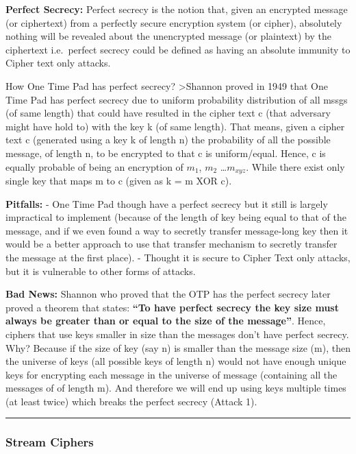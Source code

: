 \documentclass[11pt]{article}
\begin{document}
\textbf{Perfect Secrecy:} Perfect secrecy is the notion that, given an
encrypted message (or ciphertext) from a perfectly secure encryption
system (or cipher), absolutely nothing will be revealed about the
unencrypted message (or plaintext) by the ciphertext i.e.~perfect
secrecy could be defined as having an absolute immunity to Cipher text
only attacks.

How One Time Pad has perfect secrecy? \textgreater{}Shannon proved in
1949 that One Time Pad has perfect secrecy due to uniform probability
distribution of all mssgs (of same length) that could have resulted in
the cipher text c (that adversary might have hold to) with the key k (of
same length). That means, given a cipher text c (generated using a key k
of length n) the probability of all the possible message, of length n,
to be encrypted to that c is uniform/equal. Hence, c is equally probable
of being an encryption of \(m_{1}\), \(m_{2}\) \ldots{}\(m_{xyz}\).
While there exist only single key that maps m to c (given as k = m XOR
c).

\textbf{Pitfalls:} - One Time Pad though have a perfect secrecy but it
still is largely impractical to implement (because of the length of key
being equal to that of the message, and if we even found a way to
secretly transfer message-long key then it would be a better approach to
use that transfer mechanism to secretly transfer the message at the
first place). - Thought it is secure to Cipher Text only attacks, but it
is vulnerable to other forms of attacks.

\textbf{Bad News:} Shannon who proved that the OTP has the perfect
secrecy later proved a theorem that states: \textbf{``To have perfect
secrecy the key size must always be greater than or equal to the size of
the message''}. Hence, ciphers that use keys smaller in size than the
messages don't have perfect secrecy. Why? Because if the size of key
(say n) is smaller than the message size (m), then the universe of keys
(all possible keys of length n) would not have enough unique keys for
encrypting each message in the universe of message (containing all the
messages of of length m). And therefore we will end up using keys
multiple times (at least twice) which breaks the perfect secrecy (Attack
1).

\begin{center}\rule{0.5\linewidth}{\linethickness}\end{center}

    \hypertarget{stream-ciphers}{%
\subsubsection{Stream Ciphers}\label{stream-ciphers}}
\end{document}
